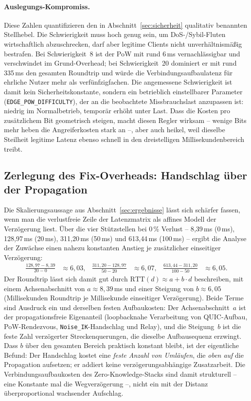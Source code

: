\paragraph{Auslegungs-Kompromiss.} Diese Zahlen quantifizieren den in
Abschnitt~\ref{sec:sicherheit} qualitativ benannten Stellhebel. Die
Schwierigkeit muss hoch genug sein, um DoS-/Sybil-Fluten wirtschaftlich
abzuschrecken, darf aber legitime Clients nicht unverhältnismäßig bestrafen. Bei Schwierigkeit~8 ist der PoW mit rund 6\,ms
vernachlässigbar und verschwindet im Grund-Overhead; bei Schwierigkeit~20
dominiert er mit rund 335\,ms den gesamten Roundtrip und würde die
Verbindungsaufbaulatenz für ehrliche Nutzer mehr als verfünfzigfachen. Die
angemessene Schwierigkeit ist damit kein Sicherheitskonstante, sondern ein
betrieblich einstellbarer Parameter (\texttt{EDGE\_POW\_DIFFICULTY}), der an die
beobachtete Missbrauchslast anzupassen ist: niedrig im Normalbetrieb, temporär
erhöht unter Last. Dass die Kosten pro zusätzlichem Bit geometrisch steigen,
macht diesen Regler wirksam -- wenige Bits mehr heben die Angreiferkosten stark
an --, aber auch heikel, weil dieselbe Steilheit legitime Latenz ebenso schnell
in den dreistelligen Millisekundenbereich treibt.

\subsection{Zerlegung des Fix-Overheads: Handschlag über der Propagation}
\label{sec:eval-fixcost}

Die Skalierungsaussage aus Abschnitt~\ref{sec:ergebnisse} lässt sich schärfer
fassen, wenn man die verlustfreie Zeile der Latenzmatrix als affines Modell der
Verzögerung liest. Über die vier Stützstellen bei 0\,\% Verlust
-- 8{,}39\,ms (0\,ms), 128{,}97\,ms (20\,ms), 311{,}20\,ms (50\,ms) und
613{,}44\,ms (100\,ms) -- ergibt die Analyse der Zuwächse einen nahezu
konstanten Anstieg je zusätzlicher einseitiger Verzögerung:
\begin{align*}
  \frac{128{,}97 - 8{,}39}{20 - 0}   &\approx 6{,}03, &
  \frac{311{,}20 - 128{,}97}{50 - 20} &\approx 6{,}07, &
  \frac{613{,}44 - 311{,}20}{100 - 50} &\approx 6{,}05.
\end{align*}
Der Roundtrip lässt sich damit gut durch $\mathrm{RTT}(d) \approx a + b\cdot d$
beschreiben, mit einem Achsenabschnitt von $a \approx 8{,}39$\,ms und einer
Steigung von $b \approx 6{,}05$ (Millisekunden Roundtrip je Millisekunde
einseitiger Verzögerung). Beide Terme sind Ausdruck ein und derselben festen
Aufbaukosten: Der Achsenabschnitt~$a$ ist der propagationsfreie Eigenanteil
(loopbacknahe Verarbeitung von QUIC-Aufbau, PoW-Rendezvous,
\texttt{Noise\_IK}-Handschlag und Relay), und die Steigung~$b$ ist die feste
Zahl verzögerter Streckenquerungen, die dieselbe Aufbausequenz erzwingt. Dass
$b$ über den gesamten Bereich praktisch konstant bleibt, ist der eigentliche
Befund: Der Handschlag kostet eine \emph{feste Anzahl von Umläufen}, die
\emph{oben auf} die Propagation aufsetzen; er addiert keine verzögerungsabhängige
Zusatzarbeit. Die Verbindungsaufbaukosten des Zero-Knowledge-Stacks sind damit
strukturell -- eine Konstante mal die Wegverzögerung --, nicht ein mit der
Distanz überproportional wachsender Aufschlag.

